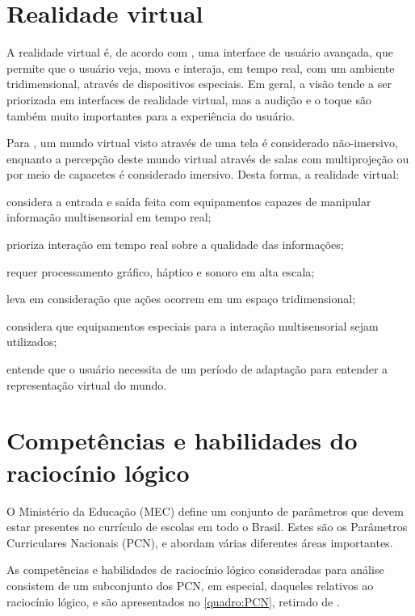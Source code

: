 \section{Realidade virtual}\label{sec-realidadevirtual}

A realidade virtual é, de acordo com \cite{kirner:2007:RV_e_RA}, uma interface de
usuário avançada, que permite que o usuário veja, mova e interaja, em tempo real, 
com um ambiente tridimensional, através de dispositivos especiais. Em geral, a visão
tende a ser priorizada em interfaces de realidade virtual, mas a audição e o toque 
são também muito importantes para a experiência do usuário.

Para \cite{kirner:2011:evolucao_RV}, um mundo virtual visto através de uma tela é
considerado não-imersivo, enquanto a percepção deste mundo virtual através de salas 
com multiprojeção ou por meio de capacetes é considerado imersivo. Desta forma, a
realidade virtual:

\begin{alineas}
	\item considera a entrada e saída feita com equipamentos capazes de manipular 
	informação multisensorial em tempo real;
	\item prioriza interação em tempo real sobre a qualidade das informações;
	\item requer processamento gráfico, háptico e sonoro em alta escala;
	\item leva em consideração que ações ocorrem em um espaço tridimensional;
	\item considera que equipamentos especiais para a interação multisensorial sejam
	utilizados;
	\item entende que o usuário necessita de um período de adaptação para entender a
	representação virtual do mundo.
\end{alineas}

\section{Competências e habilidades do raciocínio lógico}\label{sec-competenciashabilidades}

O Ministério da Educação (MEC) define um conjunto de parâmetros que devem estar
presentes no currículo de escolas em todo o Brasil. Estes são os Parâmetros
Curriculares Nacionais (PCN), e abordam várias diferentes áreas importantes. 

As competências e habilidades de raciocínio lógico consideradas para análise
consistem de um subconjunto dos PCN, em especial, daqueles relativos ao 
raciocínio lógico, e são apresentados no \autoref{quadro:PCN}, retirado de
\cite{Tabuti:2015:tabela_habilidades}.

